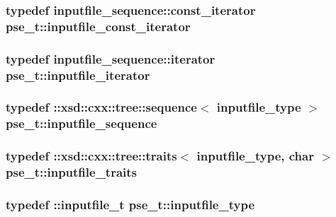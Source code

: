 \hypertarget{classpse__t_a56e96d807f4fb19912690b53fe95d20b}{
\subsubsection[{inputfile\-\_\-const\-\_\-iterator}]{\setlength{\rightskip}{0pt plus 5cm}typedef inputfile\-\_\-sequence\-::const\-\_\-iterator {\bf pse\-\_\-t\-::inputfile\-\_\-const\-\_\-iterator}}}\label{classpse__t_a56e96d807f4fb19912690b53fe95d20b}
\hypertarget{classpse__t_a18cbe2015326033fa7dc6f53112daa5f}{
\subsubsection[{inputfile\-\_\-iterator}]{\setlength{\rightskip}{0pt plus 5cm}typedef inputfile\-\_\-sequence\-::iterator {\bf pse\-\_\-t\-::inputfile\-\_\-iterator}}}\label{classpse__t_a18cbe2015326033fa7dc6f53112daa5f}
\hypertarget{classpse__t_a4256607256aa600165964a3a6d7b4a00}{
\subsubsection[{inputfile\-\_\-sequence}]{\setlength{\rightskip}{0pt plus 5cm}typedef \-::xsd\-::cxx\-::tree\-::sequence$<$ {\bf inputfile\-\_\-type} $>$ {\bf pse\-\_\-t\-::inputfile\-\_\-sequence}}}\label{classpse__t_a4256607256aa600165964a3a6d7b4a00}
\hypertarget{classpse__t_aa1b26e25c5698d3db17f0d9997faec05}{
\subsubsection[{inputfile\-\_\-traits}]{\setlength{\rightskip}{0pt plus 5cm}typedef \-::xsd\-::cxx\-::tree\-::traits$<$ {\bf inputfile\-\_\-type}, char $>$ {\bf pse\-\_\-t\-::inputfile\-\_\-traits}}}\label{classpse__t_aa1b26e25c5698d3db17f0d9997faec05}
\hypertarget{classpse__t_a86a1a849175762d6b2d8d254a694d43c}{
\subsubsection[{inputfile\-\_\-type}]{\setlength{\rightskip}{0pt plus 5cm}typedef \-::{\bf inputfile\-\_\-t} {\bf pse\-\_\-t\-::inputfile\-\_\-type}}}\label{classpse__t_a86a1a849175762d6b2d8d254a694d43c}
